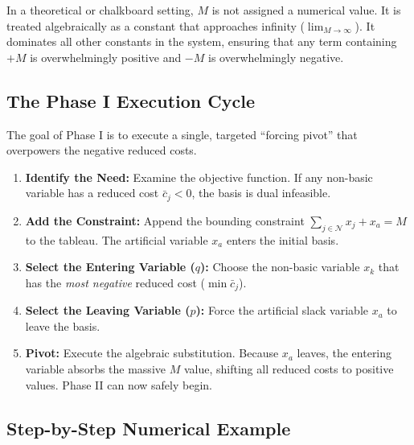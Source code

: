 \documentclass[11pt, a4paper]{article}
\begin{document}
\begin{note}
In a theoretical or chalkboard setting, $M$ is not assigned a numerical value. It is treated algebraically as a constant that approaches infinity ($\lim_{M \to \infty}$). It dominates all other constants in the system, ensuring that any term containing $+M$ is overwhelmingly positive and $-M$ is overwhelmingly negative.
\end{note}

\subsection{The Phase I Execution Cycle}

The goal of Phase I is to execute a single, targeted ``forcing pivot'' that overpowers the negative reduced costs.

\begin{algostep}
\begin{enumerate}[label=\textbf{\arabic*.}, leftmargin=*, itemsep=2pt]
    \item \textbf{Identify the Need:} Examine the objective function. If any non-basic variable has a reduced cost $\bar{c}_j < 0$, the basis is dual infeasible.
    \item \textbf{Add the Constraint:} Append the bounding constraint $\sum_{j \in \mathcal{N}} x_j + x_a = M$ to the tableau. The artificial variable $x_a$ enters the initial basis.
    \item \textbf{Select the Entering Variable ($q$):} Choose the non-basic variable $x_k$ that has the \emph{most negative} reduced cost ($\min \bar{c}_j$).
    \item \textbf{Select the Leaving Variable ($p$):} Force the artificial slack variable $x_a$ to leave the basis.
    \item \textbf{Pivot:} Execute the algebraic substitution. Because $x_a$ leaves, the entering variable absorbs the massive $M$ value, shifting all reduced costs to positive values. Phase II can now safely begin.
\end{enumerate}
\end{algostep}

\subsection{Step-by-Step Numerical Example}
\end{document}
